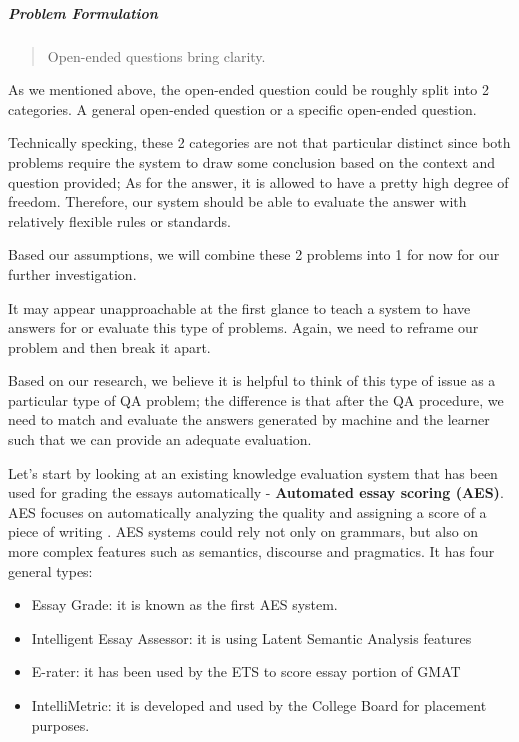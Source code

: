 \documentclass{acm_proc_article-sp}
\begin{document}
\subparagraph{Problem Formulation}\label{problem-formulation-1}

\begin{quote}
Open-ended questions bring clarity.
\end{quote}

As we mentioned above, the open-ended question could be roughly split
into 2 categories. A general open-ended question or a specific
open-ended question.

Technically specking, these 2 categories are not that particular
distinct since both problems require the system to draw some conclusion
based on the context and question provided; As for the answer, it is
allowed to have a pretty high degree of freedom. Therefore, our system
should be able to evaluate the answer with relatively flexible rules or
standards.

Based our assumptions, we will combine these 2 problems into 1 for now
for our further investigation.

It may appear unapproachable at the first glance to teach a system to
have answers for or evaluate this type of problems. Again, we need to
reframe our problem and then break it apart.

Based on our research, we believe it is helpful to think of this type of
issue as a particular type of QA problem; the difference is that after
the QA procedure, we need to match and evaluate the answers generated by
machine and the learner such that we can provide an adequate evaluation.

Let's start by looking at an existing knowledge evaluation system that
has been used for grading the essays automatically - \textbf{Automated
essay scoring (AES)}. AES focuses on automatically analyzing the quality
and assigning a score of a piece of writing . AES systems could rely not
only on grammars, but also on more complex features such as semantics,
discourse and pragmatics. It has four general types:

\begin{itemize}
\item
  Essay Grade: it is known as the first AES system.
\item
  Intelligent Essay Assessor: it is using Latent Semantic Analysis
  features
\item
  E-rater: it has been used by the ETS to score essay portion of GMAT
\item
  IntelliMetric: it is developed and used by the College Board for
  placement purposes.
\end{itemize}
\end{document}
